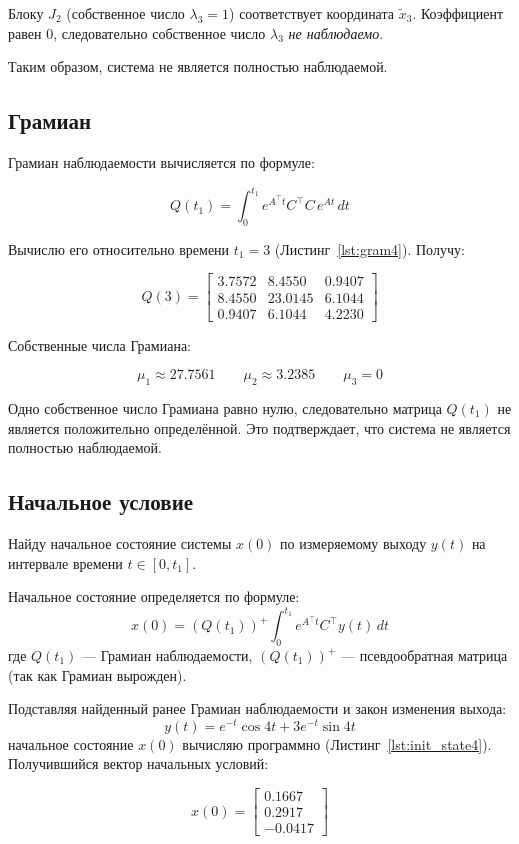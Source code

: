 \documentclass[a4paper,12pt]{article}
\begin{document}
	Блоку $J_2$ (собственное число $\lambda_3 = 1$)
	соответствует координата $\tilde{x}_3$.
	Коэффициент равен $0$, следовательно собственное число $\lambda_3$ \textit{не наблюдаемо}.
	
	Таким образом, система не является полностью наблюдаемой.
	
	\subsection{Грамиан}
	
	Грамиан наблюдаемости вычисляется по формуле:
	
	\[
	Q(t_1) = \int_0^{t_1} e^{A^\top t} C^\top C \, e^{A t} \, dt
	\]
	
	Вычислю его относительно времени $t_1 = 3$ (Листинг~\ref{lst:gram4}). Получу:
	
	\[
	Q(3) =
	\begin{bmatrix}
		3.7572 & 8.4550 & 0.9407 \\
		8.4550 & 23.0145 & 6.1044 \\
		0.9407 & 6.1044 & 4.2230
	\end{bmatrix}
	\]
	
	Собственные числа Грамиана:
	
	\[
	\mu_1 \approx 27.7561 \qquad \mu_2 \approx 3.2385 \qquad \mu_3 = 0
	\]
	
	Одно собственное число Грамиана равно нулю, следовательно матрица $Q(t_1)$
	не является положительно определённой. Это подтверждает, что система не
	является полностью наблюдаемой.
	
	
	\subsection{Начальное условие}
	
	Найду начальное состояние системы $x(0)$ по измеряемому выходу $y(t)$
	на интервале времени $t \in [0, t_1]$.
	
	Начальное состояние определяется по формуле:
	\[
	x(0) = \left(Q(t_1)\right)^{+} \int_0^{t_1} e^{A^\top t} C^\top y(t) \, dt
	\]
	где $Q(t_1)$ --- Грамиан наблюдаемости, $\left(Q(t_1)\right)^{+}$ ---
	псевдообратная матрица (так как Грамиан вырожден).
	
	Подставляя найденный ранее Грамиан наблюдаемости и закон изменения выхода:
	\[
	y(t) = e^{-t}\cos 4t + 3e^{-t}\sin 4t
	\]
	начальное состояние $x(0)$ вычисляю программно
	(Листинг~\ref{lst:init_state4}). Получившийся вектор начальных условий:
	
	\[
	x(0) =
	\begin{bmatrix}
		0.1667 \\ 0.2917 \\ -0.0417
	\end{bmatrix}
	\]
	
\end{document}
